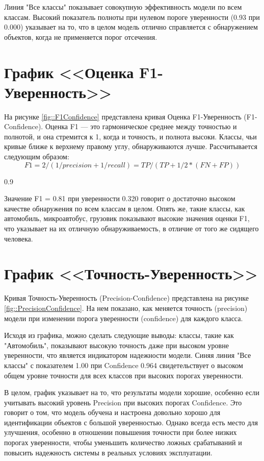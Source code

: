 Линия "Все классы" показывает совокупную эффективность модели по всем классам.
Высокий показатель полноты при нулевом пороге уверенности (0.93 при 0.000) указывает
на то, что в целом модель отлично справляется с обнаружением объектов, когда не
применяется порог отсечения.

\section{График <<Оценка F1-Уверенность>>}

На рисунке \ref{fig::F1Confidence} представлена кривая Оценка F1-Уверенность (F1-
Confidence). Оценка F1 — это гармоническое среднее между точностью и полнотой, и
она стремится к 1, когда и точность, и полнота высоки. Классы, чьи кривые ближе к
верхнему правому углу, обнаруживаются лучше. Рассчитывается следующим образом:
\[ F1 = 2/(1/precision + 1/recall) = TP/(TP+1/2*(FN+FP))\]

{0.9}

Значение F1 = 0.81 при уверенности 0.320 говорит о достаточно высоком качестве 
обнаружения по всем классам в целом. Опять же, такие классы, как автомобиль,
микроавтобус, грузовик показывают высокие значения оценки F1, что указывает на их
отличную обнаруживаемость, в отличие от того же сидящего человека.

\section{График <<Точность-Уверенность>>}

Кривая Точность-Уверенность (Precision-Confidence) представлена на рисунке 
\ref{fig::PrecisionConfidence}. На нем показано, как меняется точность (precision)
модели при изменении порога уверенности (confidence) для каждого класса.


Исходя из графика, можно сделать следующие выводы: классы, такие как "Автомобиль",
показывают высокую точность даже при высоком уровне уверенности, что является
индикатором надежности модели. Синяя линия "Все классы" с показателем 1.00 при
Confidence 0.964 свидетельствует о высоком общем уровне точности для всех классов
при высоких порогах уверенности.

В целом, график указывает на то, что результаты модели хорошие, особенно если учитывать
высокий уровень Precision при высоких порогах Confidence. Это говорит о том, что модель
обучена и настроена довольно хорошо для идентификации объектов с большой уверенностью.
Однако всегда есть место для улучшения, особенно в отношении повышения точности при более
низких порогах уверенности, чтобы уменьшить количество ложных срабатываний и повысить
надежность системы в реальных условиях эксплуатации.

